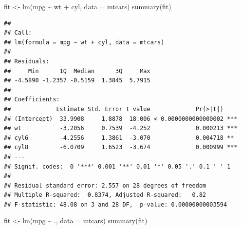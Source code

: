 \documentclass[
  12pt,
]{book}
\newenvironment{Shaded}{\begin{snugshade}}{\end{snugshade}}
\newcommand{\AttributeTok}[1]{\textcolor[rgb]{0.77,0.63,0.00}{#1}}
\newcommand{\FunctionTok}[1]{\textcolor[rgb]{0.00,0.00,0.00}{#1}}
\newcommand{\NormalTok}[1]{#1}
\newcommand{\OtherTok}[1]{\textcolor[rgb]{0.56,0.35,0.01}{#1}}
\newcommand{\SpecialCharTok}[1]{\textcolor[rgb]{0.00,0.00,0.00}{#1}}
\theoremstyle{definition}
\theoremstyle{definition}
\theoremstyle{definition}
\theoremstyle{remark}
\begin{document}
\begin{Shaded}
\begin{Highlighting}[]
\NormalTok{fit }\OtherTok{\textless{}{-}} \FunctionTok{lm}\NormalTok{(mpg }\SpecialCharTok{\textasciitilde{}}\NormalTok{ wt }\SpecialCharTok{+}\NormalTok{ cyl, }\AttributeTok{data =}\NormalTok{ mtcars)}
\FunctionTok{summary}\NormalTok{(fit)}
\end{Highlighting}
\end{Shaded}

\begin{verbatim}
## 
## Call:
## lm(formula = mpg ~ wt + cyl, data = mtcars)
## 
## Residuals:
##     Min      1Q  Median      3Q     Max 
## -4.5890 -1.2357 -0.5159  1.3845  5.7915 
## 
## Coefficients:
##             Estimate Std. Error t value             Pr(>|t|)    
## (Intercept)  33.9908     1.8878  18.006 < 0.0000000000000002 ***
## wt           -3.2056     0.7539  -4.252             0.000213 ***
## cyl6         -4.2556     1.3861  -3.070             0.004718 ** 
## cyl8         -6.0709     1.6523  -3.674             0.000999 ***
## ---
## Signif. codes:  0 '***' 0.001 '**' 0.01 '*' 0.05 '.' 0.1 ' ' 1
## 
## Residual standard error: 2.557 on 28 degrees of freedom
## Multiple R-squared:  0.8374, Adjusted R-squared:   0.82 
## F-statistic: 48.08 on 3 and 28 DF,  p-value: 0.00000000003594
\end{verbatim}

\begin{Shaded}
\begin{Highlighting}[]
\NormalTok{fit }\OtherTok{\textless{}{-}} \FunctionTok{lm}\NormalTok{(mpg }\SpecialCharTok{\textasciitilde{}}\NormalTok{ ., }\AttributeTok{data =}\NormalTok{ mtcars)}
\FunctionTok{summary}\NormalTok{(fit)}
\end{Highlighting}
\end{Shaded}
\end{document}
